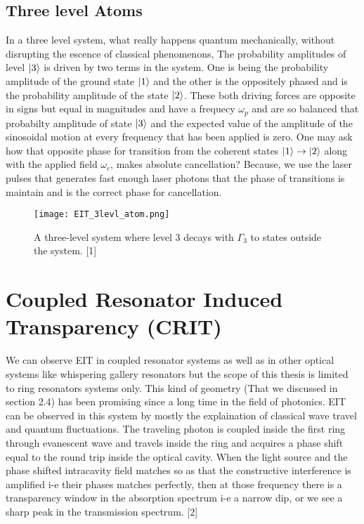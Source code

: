\subsection{Three level Atoms}
In a three level system, what really happens quantum mechanically, without disrupting the escence of classical phenomenons, The probability amplitudes of level $\ket{3}$ is driven by two terms in the system. One is being the probability amplitude of the ground state $\ket{1}$ and the other is the oppositely phased and is the probability amplitude of the state $\ket{2}$. These both driving forces are opposite in signs but equal in magnitudes and have a frequecy $\omega_{p}$ and are so balanced that probabilty amplitude of state $\ket{3}$ and the expected value of the amplitude of the sinosoidal motion at every frequency that has been applied is zero. 
One may ask how that opposite phase for transition from the coherent states $\ket{1} \to \ket{2}$ along with the applied field $\omega_{c}$, makes absolute cancellation? Because, we use the laser pulses that generates fast enough laser photons that the phase of transitions is maintain and is the correct phase for cancellation. 

\begin{figure}[h]
\centering
\texttt{[image: EIT\_3levl\_atom.png]}
\caption{A three-level system where level 3 decays with $\Gamma_{3}$ to states outside the system. [1]}
\end{figure}


\section{Coupled Resonator Induced Transparency (CRIT)}
We can observe EIT in coupled resonator systems as well as in other optical systems like whispering gallery resonators but the scope of this thesis is limited to ring resonators systems only. This kind of geometry (That we discussed in section 2.4) has been promising since a long time in the field of photonics. EIT can be observed in this system by mostly the explaination of classical wave travel and quantum fluctuations. The traveling photon is coupled inside the first ring through evanescent wave and travels inside the ring and acquires a phase shift equal to the round trip inside the optical cavity. When the light source and the phase shifted intracavity field matches so as that the constructive interference is amplified i-e their phases matches perfectly, then at those frequency there is a transparency window in the absorption spectrum i-e a narrow dip, or we see a sharp peak in the transmission spectrum. [2] 


